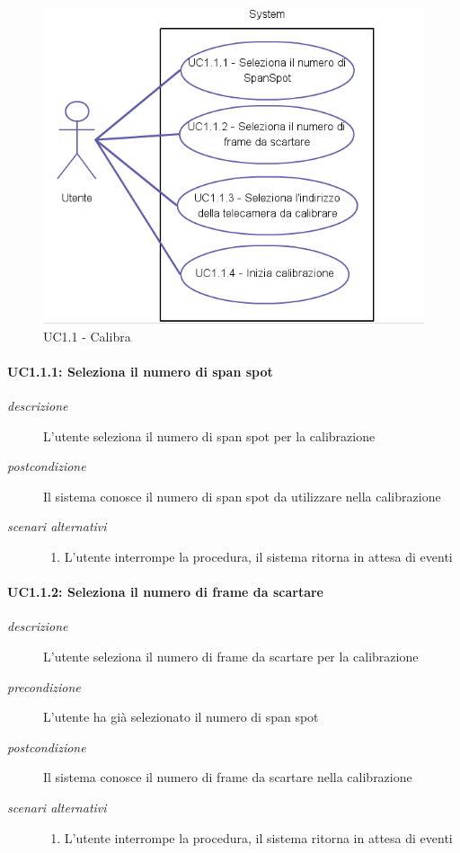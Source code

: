 \begin{figure}[htpb]
\centering
\includegraphics[scale=0.4]{./images/uc11.png}
\caption{UC1.1 - Calibra}
\label{fig:uc1.1}
\end{figure} 

\paragraph{UC1.1.1: Seleziona il numero di span spot} \label{sec:uc1.1.1}
\begin{description}
 \item[\em{descrizione}] L'utente seleziona il numero di span spot per la calibrazione
 \item[\em{postcondizione}] Il sistema conosce il numero di span spot da utilizzare nella calibrazione
  \item[\em{scenari alternativi}] \mbox{}
  \begin{enumerate} 
  \item L'utente interrompe la procedura, il sistema ritorna in attesa di eventi
  \end{enumerate}
 \end{description}

\paragraph{UC1.1.2: Seleziona il numero di frame da scartare} \label{sec:uc1.1.2}
\begin{description}
 \item[\em{descrizione}] L'utente seleziona il numero di frame da scartare per la calibrazione
 \item[\em{precondizione}] L'utente ha già selezionato il numero di span spot
 \item[\em{postcondizione}] Il sistema conosce il numero di frame da scartare nella calibrazione
 \item[\em{scenari alternativi}] \mbox{}
  \begin{enumerate}
  \item L'utente interrompe la procedura, il sistema ritorna in attesa di eventi
  \end{enumerate}
 \end{description}

